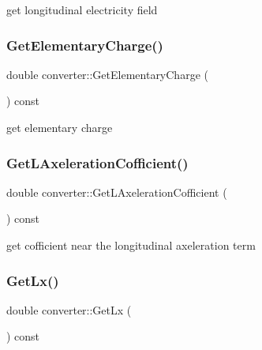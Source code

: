 get longitudinal electricity field 

\mbox{\label{classconverter_a6153436879355be9e92b477918bd1e2b}} 
\subsubsection{\texorpdfstring{Get\+Elementary\+Charge()}{GetElementaryCharge()}}
{\footnotesize\ttfamily double converter\+::\+Get\+Elementary\+Charge (\begin{DoxyParamCaption}{ }\end{DoxyParamCaption}) const}



get elementary charge 

\mbox{\label{classconverter_a671ceabb409c6401cc3b84e1b56e9497}} 
\subsubsection{\texorpdfstring{Get\+L\+Axeleration\+Cofficient()}{GetLAxelerationCofficient()}}
{\footnotesize\ttfamily double converter\+::\+Get\+L\+Axeleration\+Cofficient (\begin{DoxyParamCaption}{ }\end{DoxyParamCaption}) const}



get cofficient near the longitudinal axeleration term 

\mbox{\label{classconverter_ae315d5d2305093804dc82ae96fed56e4}} 
\subsubsection{\texorpdfstring{Get\+Lx()}{GetLx()}}
{\footnotesize\ttfamily double converter\+::\+Get\+Lx (\begin{DoxyParamCaption}{ }\end{DoxyParamCaption}) const}



